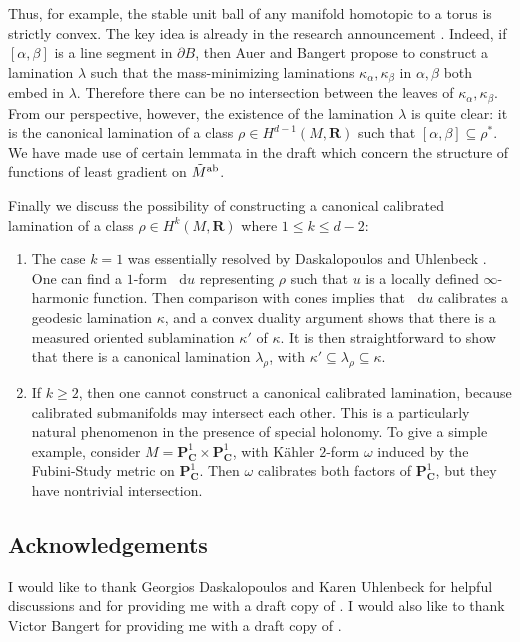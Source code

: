 \documentclass[reqno,11pt]{amsart}
\newcommand{\RR}{\mathbf{R}}
\newcommand{\CC}{\mathbf{C}}
\newcommand{\PP}{\mathbf P}
\newcommand*\dif{\mathop{}\!\mathrm{d}}
\theoremstyle{definition}
\numberwithin{equation}{section}
\begin{document}
Thus, for example, the stable unit ball of any manifold homotopic to a torus is strictly convex.
The key idea is already in the research announcement \cite{Auer01}.
Indeed, if $[\alpha, \beta]$ is a line segment in $\partial B$, then Auer and Bangert propose to construct a lamination $\lambda$ such that the mass-minimizing laminations $\kappa_\alpha, \kappa_\beta$ in $\alpha, \beta$ both embed in $\lambda$.
Therefore there can be no intersection between the leaves of $\kappa_\alpha, \kappa_\beta$.
From our perspective, however, the existence of the lamination $\lambda$ is quite clear: it is the canonical lamination of a class $\rho \in H^{d - 1}(M, \RR)$ such that $[\alpha, \beta] \subseteq \rho^*$.
We have made use of certain lemmata in the draft \cite{Auer12} which concern the structure of functions of least gradient on $\tilde M^{\rm ab}$.

Finally we discuss the possibility of constructing a canonical calibrated lamination of a class $\rho \in H^k(M, \RR)$ where $1 \leq k \leq d - 2$:
\begin{enumerate}
\item The case $k = 1$ was essentially resolved by Daskalopoulos and Uhlenbeck \cite{daskalopoulos2020transverse}.
One can find a $1$-form $\dif u$ representing $\rho$ such that $u$ is a locally defined $\infty$-harmonic function.
Then comparison with cones implies that $\dif u$ calibrates a geodesic lamination $\kappa$, and a convex duality argument shows that there is a measured oriented sublamination $\kappa'$ of $\kappa$.
It is then straightforward to show that there is a canonical lamination $\lambda_\rho$, with $\kappa' \subseteq \lambda_\rho \subseteq \kappa$.
\item If $k \geq 2$, then one cannot construct a canonical calibrated lamination, because calibrated submanifolds may intersect each other.
This is a particularly natural phenomenon in the presence of special holonomy.
To give a simple example, consider $M = \PP^1_\CC \times \PP^1_\CC$, with K\"ahler $2$-form $\omega$ induced by the Fubini-Study metric on $\PP^1_\CC$.
Then $\omega$ calibrates both factors of $\PP^1_\CC$, but they have nontrivial intersection.
\end{enumerate}

\subsection{Acknowledgements}
I would like to thank Georgios Daskalopoulos and Karen Uhlenbeck for helpful discussions and for providing me with a draft copy of \cite{daskalopoulos2023}.
I would also like to thank Victor Bangert for providing me with a draft copy of \cite{Auer12}.
\end{document}
